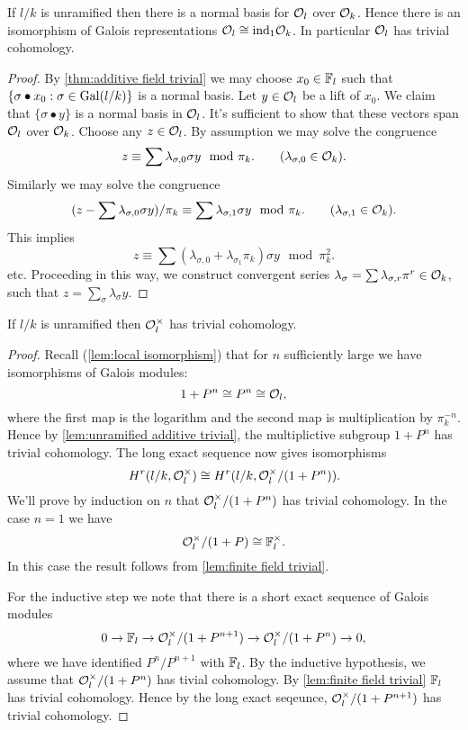 \begin{lemma} \label{lem:unramified additive trivial}
	If $l/k$ is unramified then there is a normal basis for ${\mathcal O}_l$ over ${\mathcal O}_k$.
	Hence there is an isomorphism of Galois representations ${\mathcal O}_l \cong \mathrm{ind}_1 {\mathcal O}_k$.
	In particular ${\mathcal O}_l$ has trivial cohomology.
\end{lemma}

\begin{proof}
	By \ref{thm:additive field trivial}
	we may choose $x_0 \in {\mathbb F}_l$
	such that $\{\sigma \bullet x_0 :\sigma \in \mathrm{Gal}(l/k)\}$ is a normal basis.
	Let $y \in {\mathcal O}_l$ be a lift of $x_0$.
	We claim that $\{\sigma \bullet y\}$ is a normal basis
	in ${\mathcal O}_l$. It's sufficient to show that these vectors span ${\mathcal O}_l$ over ${\mathcal O}_k$.
	Choose any $z \in {\mathcal O}_l$. By assumption we may solve the congruence
	\[
		z \equiv \sum \lambda_{\sigma,0} \sigma y \mod \pi_k.
		\qquad
		(\lambda_{\sigma,0} \in {\mathcal O}_k).
	\]
	Similarly we may solve the congruence
	\[
		(z - \sum \lambda_{\sigma,0} \sigma y) / \pi_k \equiv \sum \lambda_{\sigma,1} \sigma y \mod \pi_k.
		\qquad
		(\lambda_{\sigma,1} \in {\mathcal O}_k).
	\]
	This implies
	\[
		z \equiv \sum (\lambda_{\sigma,0} + \lambda_{\sigma_1} \pi_k) \sigma y \mod \pi_k^2.
	\]
	etc.
	Proceeding in this way, we construct convergent series
	$\lambda_{\sigma} = \sum \lambda_{\sigma,r}\pi^r \in {\mathcal O}_k$,
	such that $z = \sum_\sigma \lambda_\sigma y$.
\end{proof}




\begin{lemma}	\label{lem:unramified units trivial}
	If $l/k$ is unramified then ${\mathcal O}_l^\times$ has trivial cohomology.
\end{lemma}

\begin{proof}
	Recall (\ref{lem:local isomorphism}) that for $n$ sufficiently large we have isomorphisms of
	Galois modules:
	\[
		1 + P^n \cong P^n \cong {\mathcal O}_l,
	\]
	where the first map is the logarithm and the second map is multiplication by $\pi_k^{-n}$.
	Hence by \ref{lem:unramified additive trivial}, the multiplictive subgroup $1+P^n$ has trivial
	cohomology.
	The long exact sequence now gives isomorphisms
	\[
		H^r(l/k,{\mathcal O}_l^\times) \cong H^r(l/k,{\mathcal O}_l^\times / (1+P^n)).
	\]
	We'll prove by induction on $n$ that ${\mathcal O}_l^\times / (1+P^n)$ has trivial cohomology.
	In the case $n = 1$ we have
	\[
		{\mathcal O}_l^\times / (1+P) \cong {\mathbb F}_l^\times.
	\]
	In this case the result follows from \ref{lem:finite field trivial}.

	For the inductive step we note that there is a short exact sequence of Galois modules
	\[
		0 \to {\mathbb F}_l \to  {\mathcal O}_l^\times / (1+P^{n+1})  \to{\mathcal O}_l^\times / (1+P^n)  \to  0,
	\]
	where we have identified $P^n / P^{n+1}$ with ${\mathbb F}_l$.
	By the inductive hypothesis, we assume that ${\mathcal O}_l^\times / (1+P^n)$ has tivial cohomology.
	By \ref{lem:finite field trivial} ${\mathbb F}_l$ has trivial cohomology.
	Hence by the long exact seqeunce, ${\mathcal O}_l^\times / (1+P^{n+1})$ has trivial cohomology.
\end{proof}


